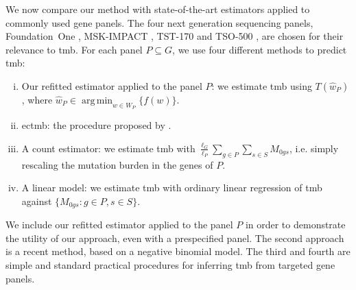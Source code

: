 \documentclass[10pt,twoside,openright]{report}
\DeclareMathOperator*{\argmin}{arg\,min}
\begin{document}

We now compare our method with state-of-the-art estimators applied to commonly used gene panels. The four next generation sequencing panels, Foundation~One \citep{frampton_development_2013}, MSK-IMPACT \citep{cheng_memorial_2015}, TST-170 \citep{heydt_evaluation_2018} and TSO-500 \citep{pestinger_use_2020}, are chosen for their relevance to \acrshort{tmb}. For each panel $P \subseteq G$, we use four different methods to predict \acrshort{tmb}:
\begin{enumerate}[(i)]
 \item Our refitted estimator applied to the panel $P$: we estimate \acrshort{tmb} using $T(\hat{w}_P)$, where $\hat{w}_P \in \argmin_{w \in W_P} \{f(w)\}$. 
 \item \acrshort{ectmb}: the procedure proposed by \citet{yao_ectmb_2020}.
 \item A count estimator: we estimate \acrshort{tmb} with $\frac{\ell_G}{\ell_P} \sum_{g \in P} \sum_{s \in S}M_{0gs}$, i.e. simply rescaling the mutation burden in the genes of $P$. 
 \item A linear model: we estimate \acrshort{tmb} with ordinary linear regression of \acrshort{tmb} against $\{M_{0gs}: g \in P, s \in S\}$.
\end{enumerate}
We include our refitted estimator applied to the panel $P$ in order to demonstrate the utility of our approach, even with a prespecified panel. The second approach is a recent method, based on a negative binomial model. The third and fourth are simple and standard practical procedures for inferring \acrshort{tmb} from targeted gene panels. 
\end{document}
